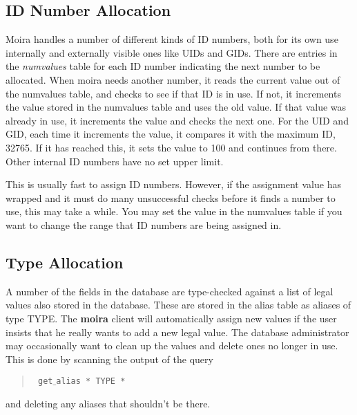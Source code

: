 \subsection{ID Number Allocation}

Moira handles a number of different kinds of ID numbers, both for its
own use internally and externally visible ones like UIDs and GIDs.
There are entries in the {\em numvalues} table for each ID number
indicating the next number to be allocated.  When moira needs another
number, it reads the current value out of the numvalues table, and
checks to see if that ID is in use.  If not, it increments the value
stored in the numvalues table and uses the old value.  If that value
was already in use, it increments the value and checks the next one.
For the UID and GID, each time it increments the value, it compares it
with the maximum ID, 32765.  If it has reached this, it sets the value
to 100 and continues from there.  Other internal ID numbers have no
set upper limit.

This is usually fast to assign ID numbers.  However, if the assignment
value has wrapped and it must do many unsuccessful checks before it
finds a number to use, this may take a while.  You may set the value
in the numvalues table if you want to change the range that ID numbers
are being assigned in.

\subsection{Type Allocation}

A number of the fields in the database are type-checked against a list
of legal values also stored in the database.  These are stored in the
alias table as aliases of type TYPE.  The {\bf moira} client will
automatically assign new values if the user insists that he really
wants to add a new legal value.  The database administrator may
occasionally want to clean up the values and delete ones no longer in
use.  This is done by scanning the output of the query
\begin{quotation}\tt
get$\_$alias * TYPE *
\end{quotation}
and deleting any aliases that shouldn't be there.

\theindex
{}



